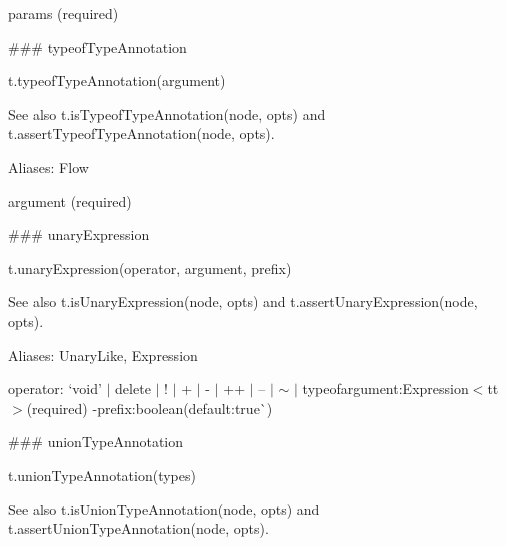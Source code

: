 \begin{DoxyItemize}
\item {\ttfamily params} (required) 


\end{DoxyItemize}

\#\#\# typeof\+Type\+Annotation 
\begin{DoxyCode}
t.typeofTypeAnnotation(argument)
\end{DoxyCode}


See also {\ttfamily t.\+is\+Typeof\+Type\+Annotation(node, opts)} and {\ttfamily t.\+assert\+Typeof\+Type\+Annotation(node, opts)}.

Aliases\+: {\ttfamily Flow}


\begin{DoxyItemize}
\item {\ttfamily argument} (required) 


\end{DoxyItemize}

\#\#\# unary\+Expression 
\begin{DoxyCode}
t.unaryExpression(operator, argument, prefix)
\end{DoxyCode}


See also {\ttfamily t.\+is\+Unary\+Expression(node, opts)} and {\ttfamily t.\+assert\+Unary\+Expression(node, opts)}.

Aliases\+: {\ttfamily Unary\+Like}, {\ttfamily Expression}


\begin{DoxyItemize}
\item {\ttfamily operator}\+: `\textquotesingle{}void' $\vert$ \textquotesingle{}delete\textquotesingle{} $\vert$ \textquotesingle{}!\textquotesingle{} $\vert$ \textquotesingle{}+\textquotesingle{} $\vert$ \textquotesingle{}-\/\textquotesingle{} $\vert$ \textquotesingle{}++\textquotesingle{} $\vert$ \textquotesingle{}--\textquotesingle{} $\vert$ \textquotesingle{}$\sim$\textquotesingle{} $\vert$ \textquotesingle{}typeofargument{\ttfamily \+:}Expression$<$tt$>$(required) -\/prefix{\ttfamily \+:}boolean{\ttfamily (default\+:}true\`{}) 


\end{DoxyItemize}

\#\#\# union\+Type\+Annotation 
\begin{DoxyCode}
t.unionTypeAnnotation(types)
\end{DoxyCode}


See also {\ttfamily t.\+is\+Union\+Type\+Annotation(node, opts)} and {\ttfamily t.\+assert\+Union\+Type\+Annotation(node, opts)}.

